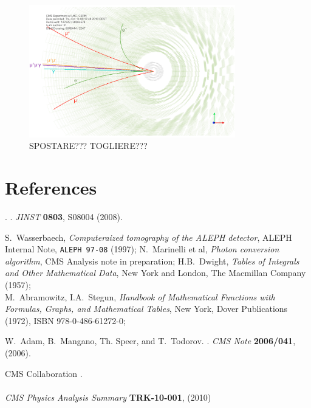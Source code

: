 \documentclass[a4paper]{jpconf}
\def\Journal#1#2#3#4{{#1} {\bf #2}, #3 (#4)}
\begin{document}
\begin{figure}[b]
    \centering
    \label{fig:evtdisplay}
    \includegraphics[width=0.8\textwidth]{fig/EvtDisplay.png}
   \caption{SPOSTARE??? TOGLIERE???}
    
    \end{figure} 





\section*{References}

\begin{thebibliography}{99}


.
.
\Journal{\em JINST}{0803}{S08004}{2008}.

 S.~Wasserbaech, {\em Computeraized tomography of the
    ALEPH detector}, ALEPH Internal Note, {\tt ALEPH 97-08} (1997);
 N.~Marinelli et al, {\em Photon conversion algorithm},
  CMS Analysis note in preparation;
 H.B.~Dwight, {\em Tables of Integrals and Other
    Mathematical Data}, New York and London, The Macmillan Company (1957);\\
  M.~Abramowitz, I.A.~Stegun, {\em Handbook of Mathematical
  Functions with Formulas, Graphs, and Mathematical Tables}, New York,
  Dover Publications (1972), ISBN 978-0-486-61272-0;


W.~Adam, B.~Mangano, Th. Speer, and T.~Todorov.
.
\Journal {\em CMS Note}{2006/041}{}{2006}.


{CMS Collaboration}
.
\\
\\
\Journal{\em CMS Physics Analysis Summary}{TRK-10-001}{}{2010}


\end{thebibliography}
\end{document}
